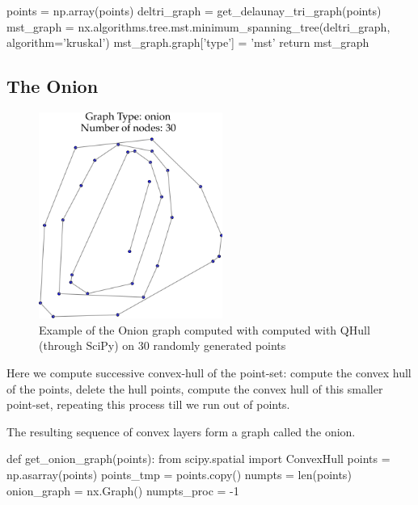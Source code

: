      points = np.array(points)
     deltri_graph = get_delaunay_tri_graph(points)
     mst_graph = nx.algorithms.tree.mst.minimum_spanning_tree(deltri_graph, \\
                                                              algorithm='kruskal')
     mst_graph.graph['type']   = 'mst'
     return mst_graph
\nwendcode{}\nwdocspar


\subsection{The Onion}

\begin{figure}[H]
  \centering
  \includegraphics[width=6cm]{./miscimages/onion-example.png}
  \caption{\label{fig:onion} Example of the Onion graph computed with computed with QHull (through SciPy) on 30 randomly generated points }
\end{figure}



Here we compute successive convex-hull of the point-set: compute the convex hull of the points, delete the hull points, 
compute the convex hull of this smaller point-set, repeating this process till we run out of points. 

The resulting sequence of convex layers form a graph called the onion. 

\nwenddocs{}\plusendmoddef\nwstartdeflinemarkup{}\nwenddeflinemarkup

def get_onion_graph(points):
     from scipy.spatial import ConvexHull
     points      = np.asarray(points)     
     points_tmp  = points.copy()
     numpts      = len(points)
     onion_graph = nx.Graph()
     numpts_proc = -1


